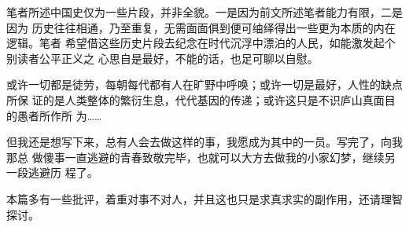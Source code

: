 笔者所述中国史仅为一些片段，并非全貌。一是因为前文所述笔者能力有限，二是因为
历史往往相通，乃至重复，无需面面俱到便可䌷绎得出一些更为本质的内在逻辑。笔者
希望借这些历史片段去纪念在时代沉浮中漂泊的人民，如能激发起个别读者公平正义之
心思自是最好，不能的话，也足可聊以自慰。

或许一切都是徒劳，每朝每代都有人在旷野中呼唤；或许一切是最好，人性的缺点所保
证的是人类整体的繁衍生息，代代基因的传递；或许这只是不识庐山真面目的愚者所作所
为……

但我还是想写下来，总有人会去做这样的事，我愿成为其中的一员。写完了，向我那总
做傻事一直逃避的青春致敬完毕，也就可以大方去做我的小家幻梦，继续另一段逃避历
程了。


本篇多有一些批评，着重对事不对人，并且这也只是求真求实的副作用，还请理智探讨。












